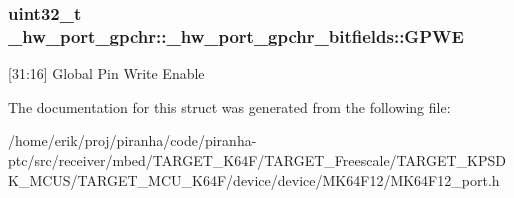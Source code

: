 \subsubsection[{\texorpdfstring{G\+P\+WE}{GPWE}}]{\setlength{\rightskip}{0pt plus 5cm}uint32\+\_\+t \+\_\+hw\+\_\+port\+\_\+gpchr\+::\+\_\+hw\+\_\+port\+\_\+gpchr\+\_\+bitfields\+::\+G\+P\+WE}\hypertarget{struct__hw__port__gpchr_1_1__hw__port__gpchr__bitfields_adcfba2c98b242c902fc11680789314e7}{}\label{struct__hw__port__gpchr_1_1__hw__port__gpchr__bitfields_adcfba2c98b242c902fc11680789314e7}
\mbox{[}31\+:16\mbox{]} Global Pin Write Enable 

The documentation for this struct was generated from the following file\+:\begin{DoxyCompactItemize}
\item 
/home/erik/proj/piranha/code/piranha-\/ptc/src/receiver/mbed/\+T\+A\+R\+G\+E\+T\+\_\+\+K64\+F/\+T\+A\+R\+G\+E\+T\+\_\+\+Freescale/\+T\+A\+R\+G\+E\+T\+\_\+\+K\+P\+S\+D\+K\+\_\+\+M\+C\+U\+S/\+T\+A\+R\+G\+E\+T\+\_\+\+M\+C\+U\+\_\+\+K64\+F/device/device/\+M\+K64\+F12/M\+K64\+F12\+\_\+port.\+h\end{DoxyCompactItemize}
